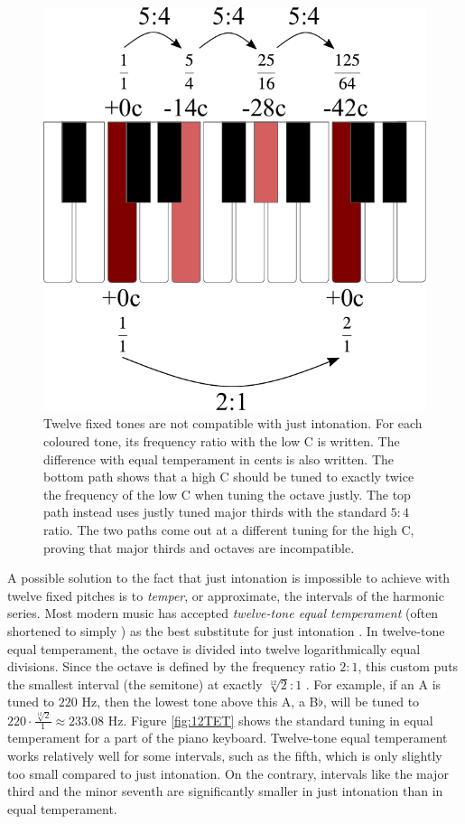 \documentclass[a4paper]{article}
\begin{document}
\begin{figure}
	\centering
	\includegraphics[height=0.35\textheight]{Figures/ThirdsProof.pdf}%
	\caption{Twelve fixed tones are not compatible with just intonation. For each coloured tone, its frequency ratio with the low C is written. The difference with equal temperament in cents is also written. The bottom path shows that a high C should be tuned to exactly twice the frequency of the low C when tuning the octave justly. The top path instead uses justly tuned major thirds with the standard $5:4$ ratio. The two paths come out at a different tuning for the high C, proving that major thirds and octaves are incompatible.}
	\label{fig:thirdsproof}
\end{figure}

A possible solution to the fact that just intonation is impossible to achieve with twelve fixed pitches is to \textit{temper}, or approximate, the intervals of the harmonic series. Most modern music has accepted \textit{twelve-tone equal temperament} (often shortened to simply ) as the best substitute for just intonation \cite{halewood_equal_2015}. In twelve-tone equal temperament, the octave is divided into twelve logarithmically equal divisions. Since the octave is defined by the frequency ratio $2:1$, this custom puts the smallest interval (the semitone) at exactly $\sqrt[12]{2}:1$ \cite{van_de_craats_fis_1989}. For example, if an A is tuned to $220$ Hz, then the lowest tone above this A, a B$\flat$, will be tuned to $220\cdot \frac{\sqrt[12]{2}}{1} \approx 233.08$ Hz. Figure \ref{fig:12TET} shows the standard tuning in equal temperament for a part of the piano keyboard. Twelve-tone equal temperament works relatively well for some intervals, such as the fifth, which is only slightly too small compared to just intonation. On the contrary, intervals like the major third and the minor seventh are significantly smaller in just intonation than in equal temperament.
\end{document}
